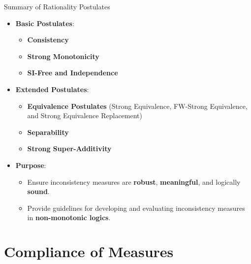 \begin{frame}{Summary of Rationality Postulates}
    \begin{itemize}
        \item \textbf{Basic Postulates}:
              \begin{itemize}
                  \item \textbf{Consistency}
                  \item \textbf{Strong Monotonicity}
                  \item \textbf{SI-Free and Independence}
              \end{itemize}
        \item \textbf{Extended Postulates}:
              \begin{itemize}
                  \item \textbf{Equivalence Postulates} (Strong Equivalence, FW-Strong Equivalence, and Strong Equivalence Replacement)
                  \item \textbf{Separability}
                  \item \textbf{Strong Super-Additivity}
              \end{itemize}
        \item \textbf{Purpose}:
              \begin{itemize}
                  \item Ensure inconsistency measures are \textbf{robust}, \textbf{meaningful}, and logically \textbf{sound}.
                  \item Provide guidelines for developing and evaluating inconsistency measures in \textbf{non-monotonic logics}.
              \end{itemize}
    \end{itemize}
\end{frame}

\section{Compliance of Measures}

